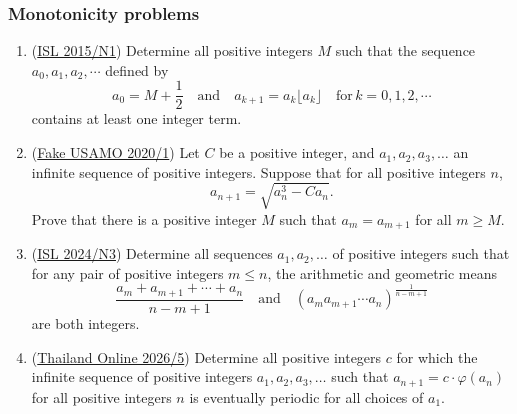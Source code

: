\documentclass[11pt,paper=letter]{scrartcl}
\begin{document}
\subsubsection*{Monotonicity problems}

\begin{enumerate}[resume]

\item (\href{https://artofproblemsolving.com/community/c6h1268859p6622268}{ISL 2015/N1}) Determine all positive integers $M$ such that the sequence $a_0, a_1, a_2, \cdots$ defined by \[ a_0 = M + \frac{1}{2} \quad \textrm{and} \quad a_{k+1} = a_k\lfloor a_k \rfloor \quad \textrm{for} \, k = 0, 1, 2, \cdots \]contains at least one integer term. \hints{\ref{h:7-1} \ref{h:7-2}}

\item (\href{https://artofproblemsolving.com/community/c6h2078501p14933592}{Fake USAMO 2020/1}) Let $C$ be a positive integer, and $a_1,a_2,a_3,\hdots$ an infinite sequence of positive integers. Suppose that for all positive integers $n$, $$a_{n+1}=\sqrt{a_n^3-Ca_n}.$$ Prove that there is a positive integer $M$ such that $a_m = a_{m+1}$ for all $m \ge M$. \hints{\ref{h:8-1} \ref{h:8-2}}

\item (\href{https://artofproblemsolving.com/community/c6h3610437p35340905}{ISL 2024/N3}) Determine all sequences $a_1, a_2, \dots$ of positive integers such that for any pair of positive integers $m\leqslant n$, the arithmetic and geometric means \[ \frac{a_m + a_{m+1} + \cdots + a_n}{n-m+1}\quad\text{and}\quad (a_ma_{m+1}\cdots a_n)^{\frac{1}{n-m+1}}\]are both integers. \hints{\ref{h:9-1} \ref{h:9-2}}

\item (\href{https://artofproblemsolving.com/community/c6h3814392p37803319}{Thailand Online 2026/5}) Determine all positive integers $c$ for which the infinite sequence of positive integers $a_1,a_2,a_3,\dots$ such that $a_{n+1}=c \cdot\varphi(a_n)$ for all positive integers $n$ is eventually periodic for all choices of $a_1$. \hints{\ref{h:10-1} \ref{h:10-2} \ref{h:10-3}}


\end{enumerate}
\end{document}
